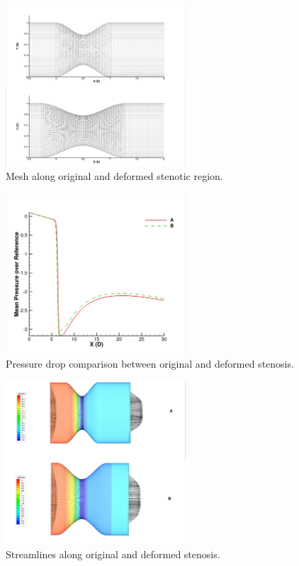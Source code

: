 \begin{figure}[H]
	\centering
	\includegraphics[trim= 1mm 0mm 0mm 0mm,clip,width=0.60\textwidth]{./pics/meshes.png}
	\caption{Mesh along original and deformed stenotic region.}
	\label{fig:Mesh along original and deformed stenotic region}
\end{figure}

\begin{figure}[H]
	\centering
	\includegraphics[trim= 1mm 0mm 1mm 0mm,clip,width=0.60\textwidth]{./pics/deform.png}
	\caption{Pressure drop comparison between original and deformed stenosis.}
	\label{fig:Pressure drop comparison between original and deformed stenosis}
\end{figure}

\begin{figure}[H]
	\centering
	\includegraphics[trim= 1mm 0mm 0mm 0mm,clip,width=0.60\textwidth]{./pics/deform2.png}
	\caption{Streamlines along original and deformed stenosis.}
	\label{fig:Streamlines along original and deformed stenosis}
\end{figure}


